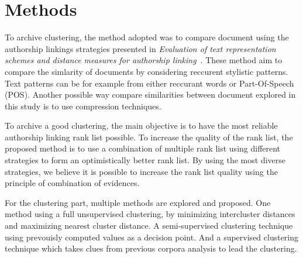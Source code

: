 \section{Methods \label{sec:methods}}

To archive clustering, the method adopted was to compare document using the authorship linkings strategies presented in \textit{Evaluation of text representation schemes and distance measures for authorship linking}~\cite{kocher_verification}.
These method aim to compare the simlarity of documents by considering reccurent stylistic patterns.
Text patterns can be for example from either reccurant words or Part-Of-Speech (POS).
Another possible way compare similarities between document explored in this study is to use compression techniques.

To archive a good clustering, the main objective is to have the most reliable authorship linking rank list possible.
To increase the quality of the rank list, the proposed method is to use a combination of multiple rank list using different strategies to form an optimistically better rank list.
By using the most diverse strategies, we believe it is possible to increase the rank list quality using the principle of combination of evidences.

For the clustering part, multiple methods are explored and proposed.
One method using a full unsupervised clustering, by minimizing intercluster distances and maximizing nearest cluster distance.
A semi-supervised clustering technique using prevouisly computed values as a decision point.
And a supervised clustering technique which takes clues from previous corpora analysis to lead the clustering.








